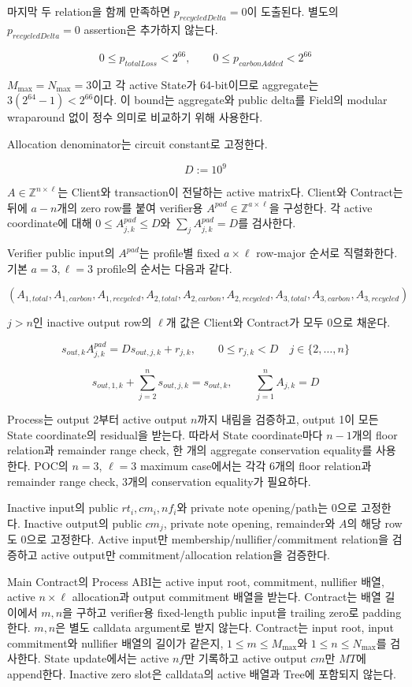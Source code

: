 \documentclass[11pt,a4paper]{extarticle}
\begin{document}
마지막 두 relation을 함께 만족하면 $p_{recycledDelta}=0$이 도출된다. 별도의
$p_{recycledDelta}=0$ assertion은 추가하지 않는다.

\[
0\leq p_{totalLoss}<2^{66},
\qquad
0\leq p_{carbonAdded}<2^{66}
\]

$M_{\max}=N_{\max}=3$이고 각 active State가 64-bit이므로 aggregate는
$3(2^{64}-1)<2^{66}$이다. 이 bound는 aggregate와 public delta를 Field의 modular
wraparound 없이 정수 의미로 비교하기 위해 사용한다.

Allocation denominator는 circuit constant로 고정한다.

\[
D:=10^9
\]

$A\in\mathbb{Z}^{n\times\ell}$는 Client와 transaction이 전달하는 active matrix다.
Client와 Contract는 뒤에 $a-n$개의 zero row를 붙여 verifier용
$A^{pad}\in\mathbb{Z}^{a\times\ell}$을 구성한다. 각 active coordinate에 대해
$0\leq A^{pad}_{j,k}\leq D$와 $\sum_jA^{pad}_{j,k}=D$를 검사한다.

Verifier public input의 $A^{pad}$는 profile별 fixed $a\times\ell$ row-major 순서로
직렬화한다. 기본
$a=3,\ell=3$ profile의 순서는 다음과 같다.

\[
(A_{1,total},A_{1,carbon},A_{1,recycled},
  A_{2,total},A_{2,carbon},A_{2,recycled},
  A_{3,total},A_{3,carbon},A_{3,recycled})
\]

$j>n$인 inactive output row의 $\ell$개 값은 Client와 Contract가 모두 0으로 채운다.

\[
s_{out,k}A^{pad}_{j,k}=Ds_{out,j,k}+r_{j,k},
\qquad
0\leq r_{j,k}<D
\quad j\in\{2,\ldots,n\}
\]

\[
s_{out,1,k}+\sum_{j=2}^{n}s_{out,j,k}=s_{out,k},
\qquad
\sum_{j=1}^{n}A_{j,k}=D
\]

Process는 output 2부터 active output $n$까지 내림을 검증하고, output 1이 모든
State coordinate의 residual을 받는다. 따라서 State coordinate마다 $n-1$개의
floor relation과 remainder range check, 한 개의 aggregate conservation equality를
사용한다. POC의 $n=3$, $\ell=3$ maximum case에서는 각각 6개의 floor relation과
remainder range check, 3개의 conservation equality가 필요하다.

Inactive input의 public $rt_i,cm_i,nf_i$와 private note opening/path는 0으로 고정한다.
Inactive output의 public $cm_j$, private note opening, remainder와 $A$의 해당 row도 0으로
고정한다. Active input만 membership/nullifier/commitment relation을 검증하고 active
output만 commitment/allocation relation을 검증한다.

Main Contract의 Process ABI는 active input root, commitment, nullifier 배열, active
$n\times\ell$ allocation과 output commitment 배열을 받는다. Contract는
배열 길이에서 $m,n$을 구하고 verifier용 fixed-length public input을 trailing zero로
padding한다. $m,n$은 별도 calldata argument로 받지 않는다. Contract는 input root,
input commitment와 nullifier 배열의 길이가 같은지,
$1\leq m\leq M_{\max}$와 $1\leq n\leq N_{\max}$를 검사한다. State update에서는
active $nf$만 기록하고 active output $cm$만 $MT$에
append한다. Inactive zero slot은 calldata의 active 배열과 Tree에 포함되지 않는다.
\end{document}
